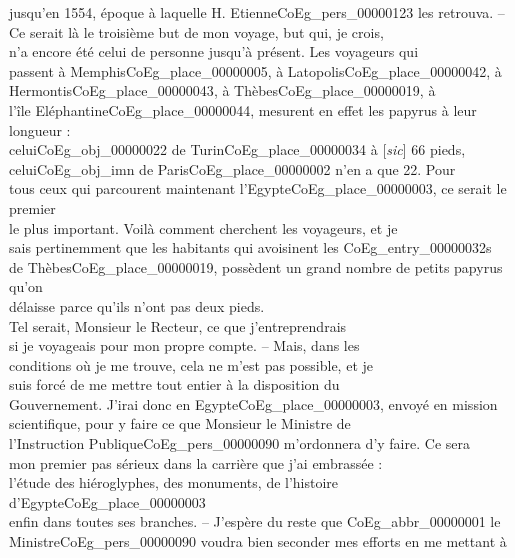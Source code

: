 \documentclass{book}
\begin{document}
jusqu’en 1554, époque à laquelle H. Etienne\gls{CoEg_pers_00000123} les retrouva. –\\
Ce serait là le troisième but de mon voyage, but qui, je crois,\\
n’a encore été celui de personne jusqu’à présent. Les voyageurs qui\\
passent à Memphis\gls{CoEg_place_00000005}, à Latopolis\gls{CoEg_place_00000042}, à Hermontis\gls{CoEg_place_00000043}, à Thèbes\gls{CoEg_place_00000019}, à\\
l’île Eléphantine\gls{CoEg_place_00000044}, mesurent en effet les papyrus à leur longueur :\\
celui\gls{CoEg_obj_00000022} de Turin\gls{CoEg_place_00000034} à [\textit{sic}] 66 pieds, celui\gls{CoEg_obj_imn} de Paris\gls{CoEg_place_00000002} n’en a que 22. Pour\\
tous ceux qui parcourent maintenant l’Egypte\gls{CoEg_place_00000003}, ce serait le premier\\
le plus important. Voilà comment cherchent les voyageurs, et je\\
sais pertinemment que les habitants qui avoisinent les \glspl{CoEg_entry_00000032}\\
de Thèbes\gls{CoEg_place_00000019}, possèdent un grand nombre de petits papyrus qu’on\\
délaisse parce qu’ils n’ont pas deux pieds.\\
\indent Tel serait, Monsieur le Recteur, ce que j’entreprendrais\\
si je voyageais pour mon propre compte. – Mais, dans les\\
conditions où je me trouve, cela ne m’est pas possible, et je\\
suis forcé de me mettre tout entier à la disposition du\\
Gouvernement. J’irai donc en Egypte\gls{CoEg_place_00000003}, envoyé en mission\\
scientifique, pour y faire ce que Monsieur le Ministre de\\
l’Instruction Publique\gls{CoEg_pers_00000090} m’ordonnera d’y faire. Ce sera\\
mon premier pas sérieux dans la carrière que j’ai embrassée :\\
l’étude des hiéroglyphes, des monuments, de l’histoire d’Egypte\gls{CoEg_place_00000003}\\
enfin dans toutes ses branches. – J’espère du reste que \gls{CoEg_abbr_00000001} le\\
Ministre\gls{CoEg_pers_00000090} voudra bien seconder mes efforts en me mettant à\\
\end{document}
